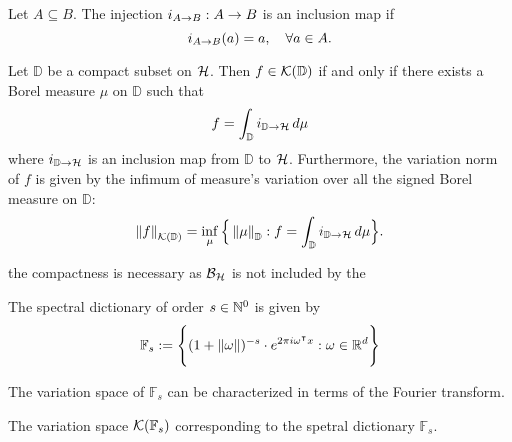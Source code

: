 \begin{definition}
    \label{def:inclusionMap}
    Let $A \subseteq B$. The injection $i_{{A}\to{B}}: A\to B$ is an
    inclusion map if
    \begin{equation}
        i_{{A}\to{B}}(a) = a, \quad \forall a \in A.
    \end{equation}
\end{definition}

\begin{lemma}
    \label{lemma:compact_set_integral_representation}
    Let $\mathbb{D}$ be a compact subset on $\mathcal{H}$. Then $f \in
    \mathcal{K}({\mathbb{D}})$ if and only if there exists a Borel measure $\mu$ on
    $\mathbb{D}$ such that
    \begin{equation}
        f = \int_{\mathbb{D}} i_{{\mathbb{D}}\to{\mathcal{H}}} \,d\mu
    \end{equation}
    where $i_{{\mathbb{D}}\to{\mathcal{H}}}$ is an inclusion map from
    $\mathbb{D}$ to $\mathcal{H}$. Furthermore, the variation norm of $f$ is given
    by the infimum of measure's variation over all the signed Borel measure on
    $\mathbb{D}$:
    \begin{equation}
        \left\| {f} \right\|_{\mathcal{K}({\mathbb{D}})} = \inf_{\mu}\Big\{
            \left\| \mu \right\|_{\mathbb{D}}: 
            f = \int_{\mathbb{D}} i_{{\mathbb{D}}\to{\mathcal{H}}} \,d\mu
        \Big\}.
    \end{equation}
\end{lemma}

\begin{remark}
    the compactness is necessary as $\mathcal{B}_{\mathcal{H}}$ is not included by the
\end{remark}

\begin{definition}
    The spectral dictionary of order $s \in \mathbb{N}^0$ is given by
    \begin{equation}
        \mathbb{F}_s := \Bigg\{ 
            (1 + \left\| \omega \right\|)^{-s} \cdot e^{2\pi i\omega{}^{\intercal} x}: 
            \omega \in \mathbb{R}^d
        \Bigg\}
    \end{equation}
\end{definition}

The variation space of $\mathbb{F}_s$ can be characterized in terms of the
Fourier transform.

The variation space $\mathcal{K}({\mathbb{F}_s})$ corresponding to the spetral
dictionary $\mathbb{F}_s$.

